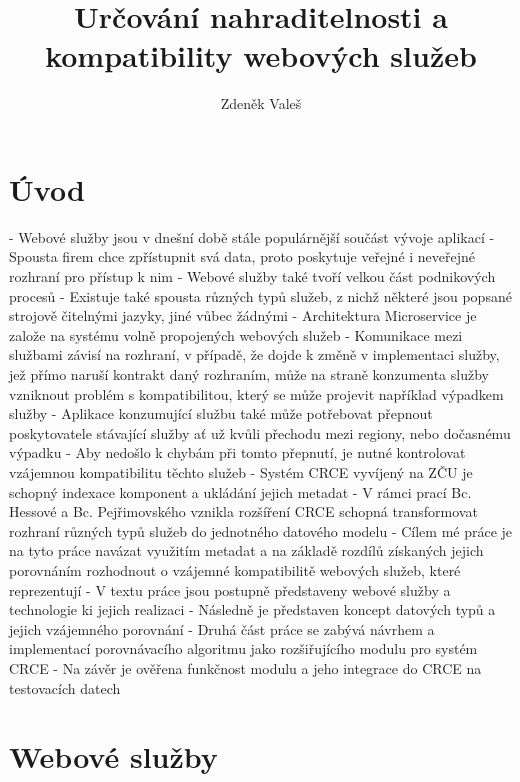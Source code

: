 \documentclass[czech,DP]{thesiskiv}
\author{Zdeněk Valeš}
\title{Určování nahraditelnosti a\\kompatibility webových služeb}
\begin{document}
%
\maketitle
\tableofcontents

\chapter{Úvod}


 - Webové služby jsou v dnešní době stále populárnější součást vývoje aplikací
 - Spousta firem chce zpřístupnit svá data, proto poskytuje veřejné i neveřejné rozhraní pro přístup k nim
 - Webové služby také tvoří velkou část podnikových procesů
 - Existuje také spousta různých typů služeb, z nichž některé jsou popsané strojově čitelnými jazyky, jiné vůbec žádnými
 - Architektura Microservice je založe na systému volně propojených webových služeb
 - Komunikace mezi službami závisí na rozhraní, v případě, že dojde k změně v implementaci služby, jež přímo naruší kontrakt daný rozhraním, může na straně konzumenta služby vzniknout problém s kompatibilitou, který se může projevit například výpadkem služby
 - Aplikace konzumující službu také může potřebovat přepnout poskytovatele stávající služby ať už kvůli přechodu mezi regiony, nebo dočasnému výpadku
 - Aby nedošlo k chybám při tomto přepnutí, je nutné kontrolovat vzájemnou kompatibilitu těchto služeb
 - Systém CRCE vyvíjený na ZČU je schopný indexace komponent a ukládání jejich metadat
 - V rámci prací Bc. Hessové a Bc. Pejřimovského vznikla rozšíření CRCE schopná transformovat rozhraní různých typů služeb do jednotného datového modelu
 - Cílem mé práce je na tyto práce navázat využitím metadat a  na základě rozdílů získaných jejich porovnáním rozhodnout o vzájemné kompatibilitě webových služeb, které reprezentují
 - V textu práce jsou postupně představeny webové služby a technologie ki jejich realizaci
 - Následně je představen koncept datových typů a jejich vzájemného porovnání
 - Druhá část práce se zabývá návrhem a implementací porovnávacího algoritmu jako rozšiřujícího modulu pro systém CRCE
 - Na závěr je ověřena funkčnost modulu a jeho integrace do CRCE na testovacích datech 

\chapter{Webové služby}
\label{sec:web-services-principles}
\end{document}
